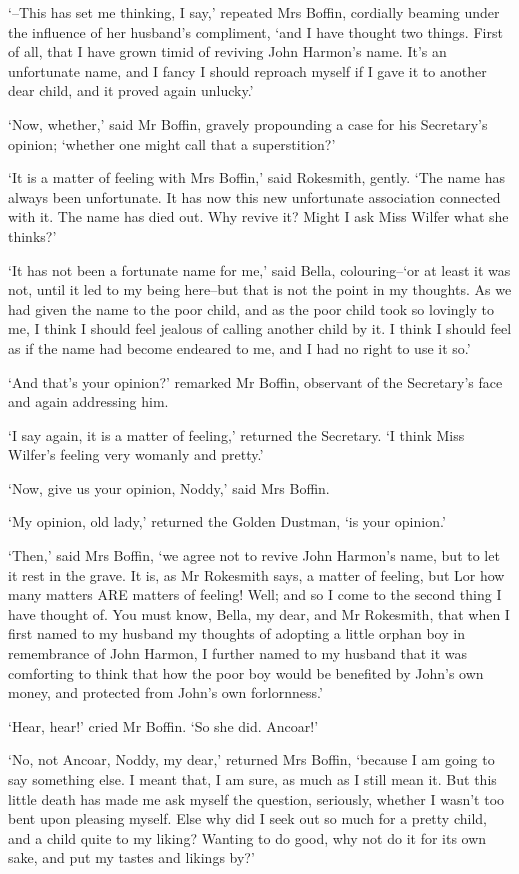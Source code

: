 ‘--This has set me thinking, I say,’ repeated Mrs Boffin, cordially
beaming under the influence of her husband’s compliment, ‘and I have
thought two things. First of all, that I have grown timid of reviving
John Harmon’s name. It’s an unfortunate name, and I fancy I should
reproach myself if I gave it to another dear child, and it proved again
unlucky.’

‘Now, whether,’ said Mr Boffin, gravely propounding a case for his
Secretary’s opinion; ‘whether one might call that a superstition?’

‘It is a matter of feeling with Mrs Boffin,’ said Rokesmith, gently.
‘The name has always been unfortunate. It has now this new unfortunate
association connected with it. The name has died out. Why revive it?
Might I ask Miss Wilfer what she thinks?’

‘It has not been a fortunate name for me,’ said Bella, colouring--‘or
at least it was not, until it led to my being here--but that is not the
point in my thoughts. As we had given the name to the poor child, and as
the poor child took so lovingly to me, I think I should feel jealous of
calling another child by it. I think I should feel as if the name had
become endeared to me, and I had no right to use it so.’

‘And that’s your opinion?’ remarked Mr Boffin, observant of the
Secretary’s face and again addressing him.

‘I say again, it is a matter of feeling,’ returned the Secretary. ‘I
think Miss Wilfer’s feeling very womanly and pretty.’

‘Now, give us your opinion, Noddy,’ said Mrs Boffin.

‘My opinion, old lady,’ returned the Golden Dustman, ‘is your opinion.’

‘Then,’ said Mrs Boffin, ‘we agree not to revive John Harmon’s name, but
to let it rest in the grave. It is, as Mr Rokesmith says, a matter of
feeling, but Lor how many matters ARE matters of feeling! Well; and so
I come to the second thing I have thought of. You must know, Bella,
my dear, and Mr Rokesmith, that when I first named to my husband my
thoughts of adopting a little orphan boy in remembrance of John Harmon,
I further named to my husband that it was comforting to think that how
the poor boy would be benefited by John’s own money, and protected from
John’s own forlornness.’

‘Hear, hear!’ cried Mr Boffin. ‘So she did. Ancoar!’

‘No, not Ancoar, Noddy, my dear,’ returned Mrs Boffin, ‘because I am
going to say something else. I meant that, I am sure, as much as
I still mean it. But this little death has made me ask myself the
question, seriously, whether I wasn’t too bent upon pleasing myself.
Else why did I seek out so much for a pretty child, and a child quite to
my liking? Wanting to do good, why not do it for its own sake, and put
my tastes and likings by?’

